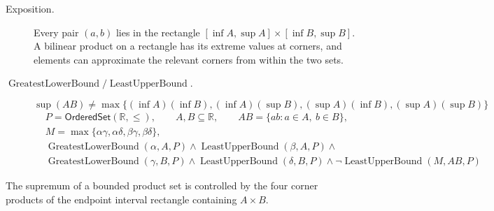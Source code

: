\begin{remark*}
\begin{description}
  \item[Exposition.]
Every pair $(a,b)$ lies in the rectangle
$[\inf A,\sup A]\times[\inf B,\sup B]$.  A bilinear product on a rectangle has
its extreme values at corners, and elements can approximate the relevant
corners from within the two sets.


  \item[\(\operatorname{GreatestLowerBound} / \operatorname{LeastUpperBound}.\)]
  \[
\sup(AB)\neq
\max\{(\inf A)(\inf B),(\inf A)(\sup B),(\sup A)(\inf B),(\sup A)(\sup B)\}
\]
\[
\begin{aligned}
&P=\mathsf{OrderedSet}(\mathbb{R},\leq),\qquad A,B\subseteq\mathbb{R},\qquad AB=\{ab:a\in A,\ b\in B\},\\
&M=\max\{\alpha\gamma,\alpha\delta,\beta\gamma,\beta\delta\},\\
&\operatorname{GreatestLowerBound}(\alpha,A,P)\land\operatorname{LeastUpperBound}(\beta,A,P)\land\\
&\operatorname{GreatestLowerBound}(\gamma,B,P)\land\operatorname{LeastUpperBound}(\delta,B,P)\land
\neg\operatorname{LeastUpperBound}(M,AB,P)
\end{aligned}
\]
\end{description}
\end{remark*}

\begin{remark*}[Interpretation]
The supremum of a bounded product set is controlled by the four corner
products of the endpoint interval rectangle containing $A\times B$.
\end{remark*}

